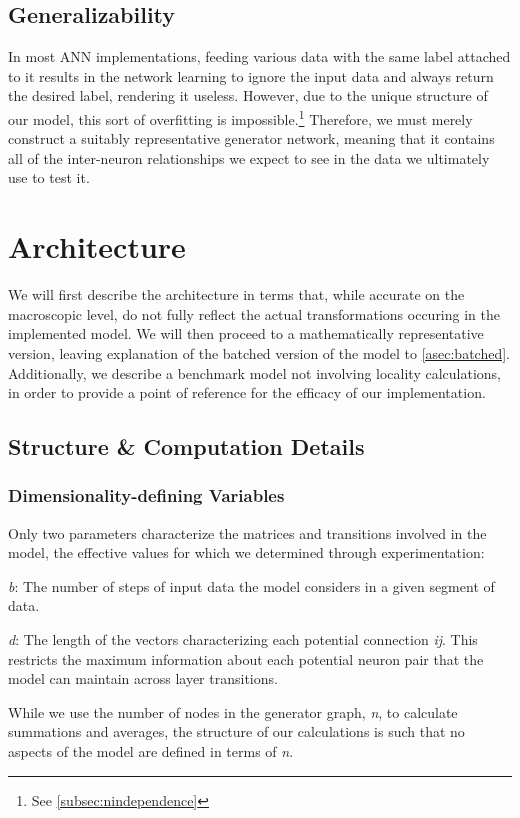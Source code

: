 \subsection{Generalizability}
\label{subsec:hotswap}
In most ANN implementations, feeding various data with the same label attached 
to it results in the network learning to ignore the input data and always return 
the desired label, rendering it useless. However, due to the unique structure of 
our model, this sort of overfitting is impossible.\footnote{See 
\ref{subsec:nindependence}} Therefore, we must merely construct a suitably 
representative generator network, meaning that it contains all of the 
inter-neuron relationships we expect to see in the data we ultimately use to 
test it.

\section{Architecture}
We will first describe the architecture in terms that, while accurate on the 
macroscopic level, do not fully reflect the actual transformations occuring in 
the implemented model. We will then proceed to a mathematically representative 
version, leaving explanation of the batched version of the model to 
\ref{asec:batched}. Additionally, we describe a benchmark model not involving 
locality calculations, in order to provide a point of reference for the efficacy 
of our implementation.

\subsection{Structure \& Computation Details}
\subsubsection{Dimensionality-defining Variables}
Only two parameters characterize the matrices and transitions involved in the 
model, the effective values for which we determined through experimentation:
\begin{description}
	\item \textit{b}: The number of steps of input data the model considers in a 
		given segment of data.
	\item \textit{d}: The length of the vectors characterizing each potential 
		connection \textit{ij}. This restricts the maximum information about 
		each potential neuron pair that the model can maintain across layer 
		transitions.
\end{description}
While we use the number of nodes in the generator graph, \textit{n}, to 
calculate summations and averages, the structure of our calculations is such 
that no aspects of the model are defined in terms of \textit{n}.


